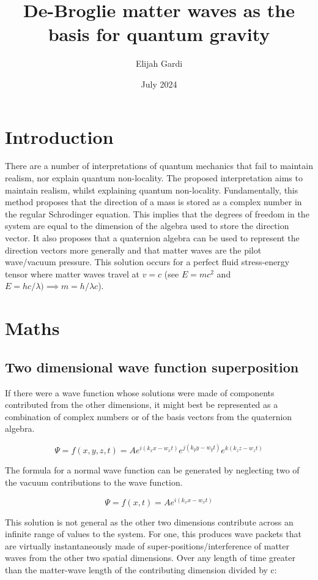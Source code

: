 \documentclass{article}
\title{De-Broglie matter waves as the basis for quantum gravity}
\author{Elijah Gardi}
\date{July 2024}
\begin{document}
\maketitle

\section{Introduction}
There are a number of interpretations of quantum mechanics that fail to maintain realism, nor explain quantum non-locality. The proposed interpretation aims to maintain realism, whilst explaining quantum non-locality. Fundamentally, this method proposes that the direction of a mass is stored as a complex number in the regular Schrodinger equation. This implies that the degrees of freedom in the system are equal to the dimension of the algebra used to store the direction vector. It also proposes that a quaternion algebra can be used to represent the direction vectors more generally and that matter waves are the pilot wave/vacuum pressure. This solution occurs for a perfect fluid stress-energy tensor where matter waves travel at $v=c$ (see $E=mc^2$ and $E=hc/\lambda) \implies m=h/\lambda c$).

\section{Maths}
\subsection{Two dimensional wave function superposition}

If there were a wave function whose solutions were made of components contributed from the other dimensions, it might best be represented as a combination of complex numbers or of the basis vectors from the quaternion algebra.

$$\Psi=f(x,y,z,t)=A e^{i(k_x x-w_x t)} e^{j(k_y y-w_y t)} e^{k(k_z z-w_z t)}$$

The formula for a normal wave function can be generated by neglecting two of the vacuum contributions to the wave function.

$$\Psi=f(x,t)=A e^{i(k_x x-w_x t)}$$

This solution is not general as the other two dimensions contribute across an infinite range of values to the system. For one, this produces wave packets that are virtually instantaneously made of super-positions/interference of matter waves from the other two spatial dimensions. Over any length of time greater than the matter-wave length of the contributing dimension divided by c: 
\end{document}
